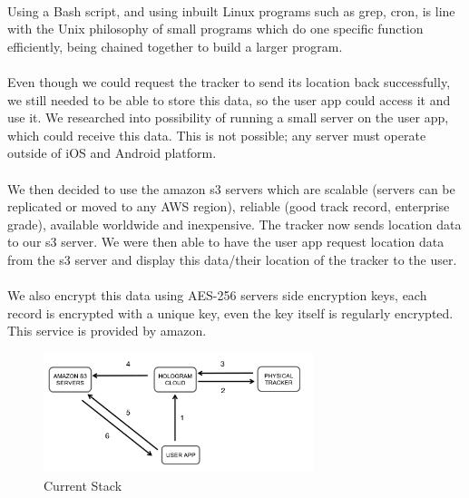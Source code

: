 \documentclass[12pt,a4paper]{article}
\begin{document}
        \paragraph{} Using a Bash script, and using inbuilt Linux programs such as grep, cron, is line with the Unix philosophy of small programs which do one specific function efficiently, being chained together to build a larger program. 
        
        \paragraph{} Even though we could request the tracker to send its location back successfully, we still needed to be able to store this data, so the user app could access it and use it. We researched into possibility of running a small server on the user app, which could receive this data. This is not possible; any server must operate outside of iOS and Android platform.
        
        \paragraph{} We then decided to use the amazon s3 servers which are scalable (servers can be replicated or moved to any AWS region), reliable (good track record, enterprise grade), available worldwide and inexpensive. The tracker now sends location data to our s3 server. We were then able to have the user app request location data from the s3 server and display this data/their location of the tracker to the user.
        
        \paragraph{} We also encrypt this data using AES-256 servers side encryption keys, each record is encrypted with a unique key, even the key itself is regularly encrypted. This service is provided by amazon.
        
        \begin{figure}[H]
          \centering
          \includegraphics[width=0.7\textwidth]{../assets/design-implement-stage-current-stack.png}
          \caption{Current Stack}
          \label{fig:Current Stack}
        \end{figure}
\end{document}
